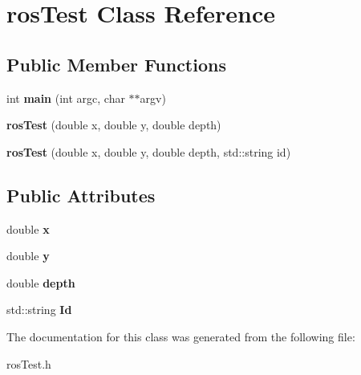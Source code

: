 \hypertarget{classrosTest}{\section{ros\-Test \-Class \-Reference}
\label{classrosTest}
}
\subsection*{\-Public \-Member \-Functions}
\begin{DoxyCompactItemize}
\item 
\hypertarget{classrosTest_afa9b77a248c2f8db191d8fd784d72e45}{int {\bfseries main} (int argc, char $\ast$$\ast$argv)}\label{classrosTest_afa9b77a248c2f8db191d8fd784d72e45}

\item 
\hypertarget{classrosTest_a526c389cdb9649dd296b89dbcdad9f6a}{{\bfseries ros\-Test} (double x, double y, double depth)}\label{classrosTest_a526c389cdb9649dd296b89dbcdad9f6a}

\item 
\hypertarget{classrosTest_ae7dabf08ff1bc7a268b0378d28c87490}{{\bfseries ros\-Test} (double x, double y, double depth, std\-::string id)}\label{classrosTest_ae7dabf08ff1bc7a268b0378d28c87490}

\end{DoxyCompactItemize}
\subsection*{\-Public \-Attributes}
\begin{DoxyCompactItemize}
\item 
\hypertarget{classrosTest_aef922baefee3d119ca6a00cf3fb2acfa}{double {\bfseries x}}\label{classrosTest_aef922baefee3d119ca6a00cf3fb2acfa}

\item 
\hypertarget{classrosTest_a932692fe011503c7bb3027f47837a566}{double {\bfseries y}}\label{classrosTest_a932692fe011503c7bb3027f47837a566}

\item 
\hypertarget{classrosTest_a91e696ba199cd627ffc8897577c5f004}{double {\bfseries depth}}\label{classrosTest_a91e696ba199cd627ffc8897577c5f004}

\item 
\hypertarget{classrosTest_ae3696343abfaccf374e70016e4afa2f3}{std\-::string {\bfseries \-Id}}\label{classrosTest_ae3696343abfaccf374e70016e4afa2f3}

\end{DoxyCompactItemize}


\-The documentation for this class was generated from the following file\-:\begin{DoxyCompactItemize}
\item 
ros\-Test.\-h\end{DoxyCompactItemize}
